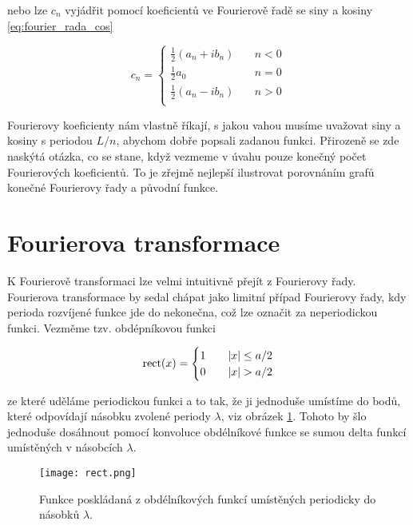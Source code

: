 nebo lze $c_n$ vyjádřit pomocí koeficientů ve Fourierově řadě se siny a kosiny \eqref{eq:fourier_rada_cos}

\begin{equation}
c_n = 
\begin{cases}
\frac{1}{2}(a_n+ib_n) & \quad n<0 \\
\frac{1}{2}a_0 & \quad n=0 \\
\frac{1}{2}(a_n-ib_n) & \quad n>0\\
\end{cases}
\end{equation}

Fourierovy koeficienty nám vlastně říkají, s jakou vahou musíme uvažovat siny a kosiny s periodou $L/n$, abychom dobře popsali zadanou funkci. Přirozeně se zde naskýtá otázka, co se stane, když vezmeme v úvahu pouze konečný počet Fourierových koeficientů. To je zřejmě nejlepší ilustrovat porovnáním grafů konečné Fourierovy řady a původní funkce.   


\section{Fourierova transformace}

K Fourierově transformaci lze velmi intuitivně přejít z Fourierovy řady. Fourierova transformace by sedal chápat jako limitní případ Fourierovy řady, kdy perioda rozvíjené funkce jde do nekonečna, což lze označit za neperiodickou funkci. Vezměme tzv. obdépníkovou funkci

\begin{equation}
{\rm rect}(x) =
\begin{cases}
1 & \quad |x|\leq a/2 \\
0 & \quad |x|> a/2\\
\end{cases}
\end{equation}

ze které uděláme periodickou funkci a to tak, že ji jednoduše umístíme do bodů, které odpovídají násobku zvolené periody $\lambda$, viz obrázek \ref{fig:rect}. Tohoto by šlo jednoduše dosáhnout pomocí konvoluce obdélníkové funkce se sumou delta funkcí umístěných v násobcích $\lambda$.

\begin{figure}[h]
\center
\texttt{[image: rect.png]}
\caption{Funkce poskládaná z obdélníkových funkcí umístěných periodicky do násobků $\lambda$.}
\label{fig:rect}
\end{figure}

